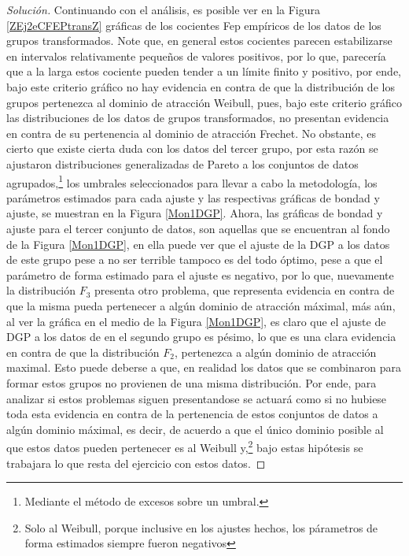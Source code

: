 \documentclass[10.5pt,notitlepage]{article}
\newenvironment{solucion}
  {\begin{proof}[Solución]}
  {\end{proof}}
\theoremstyle{plain}
\begin{document}
\begin{solucion}
Continuando con el análisis, es posible ver en la Figura \ref{ZEj2eCFEPtransZ} gráficas de los cocientes Fep empíricos de los datos de los grupos transformados. Note que, en general estos cocientes parecen estabilizarse en intervalos relativamente pequeños de valores positivos, por lo que, parecería que a la larga estos cociente pueden tender a un límite finito y positivo, por ende, bajo este criterio gráfico no hay evidencia en contra de que la distribución de los grupos pertenezca al dominio de atracción Weibull, pues, bajo este criterio gráfico las distribuciones de los datos de grupos transformados, no presentan evidencia en contra de su pertenencia al dominio de atracción Frechet. No obstante, es cierto que existe cierta duda con los datos del tercer grupo, por esta razón se ajustaron distribuciones generalizadas de Pareto a los conjuntos de datos agrupados,\footnote{Mediante el método de excesos sobre un umbral.} los umbrales seleccionados para llevar a cabo la metodología, los parámetros estimados para cada ajuste y las respectivas gráficas de bondad y ajuste, se muestran en la Figura \ref{Mon1DGP}. Ahora, las gráficas de bondad y ajuste para el tercer conjunto de datos, son aquellas que se encuentran al fondo de la Figura \ref{Mon1DGP}, en ella puede ver que el ajuste de la DGP a los datos de este grupo pese a no ser terrible tampoco es del todo óptimo, pese a que el parámetro de forma estimado para el ajuste es negativo, por lo que, nuevamente la distribución \(F_3\) presenta otro problema, que representa evidencia en contra de que la misma pueda pertenecer a algún dominio de atracción máximal, más aún, al ver la gráfica en el medio de la Figura \ref{Mon1DGP}, es claro que el ajuste de DGP a los datos de en el segundo grupo es pésimo, lo que es una clara evidencia en contra de que la distribución \(F_2\), pertenezca a algún dominio de atracción maximal. Esto puede deberse a que, en realidad los datos que se combinaron para formar estos grupos no provienen de una misma distribución. Por ende, para analizar si estos problemas siguen presentandose se actuará como si no hubiese toda esta evidencia en contra de la pertenencia de estos conjuntos de datos a algún dominio máximal, es decir, de acuerdo a que el único dominio posible al que estos datos pueden pertenecer es al Weibull y,\footnote{Solo al Weibull, porque inclusive en los ajustes hechos, los párametros de forma estimados siempre fueron negativos} bajo estas hipótesis se trabajara lo que resta del ejercicio con estos datos.


\end{solucion}
\end{document}
